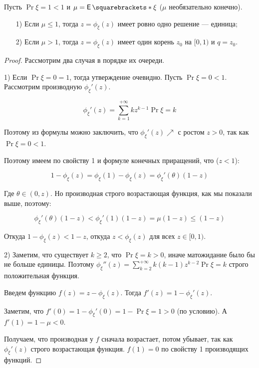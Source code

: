 \begin{theorem}
  Пусть $\Pr{\xi = 1} < 1$ и $\mu = \E{\xi}$ ($\mu$ необязательно конечно).

  \begin{itemize}
    \item[1)] Если $\mu \leq 1$, тогда $z = \phi_{\xi}(z)$  имеет ровно одно 
    решение --- единица;
    \item[2)] Если $\mu > 1$, тогда  $z = \phi_{\xi}(z)$ имеет один корень 
    $z_0$ на $[0, 1)$ и $q = z_0$.
  \end{itemize}
\end{theorem}

\begin{proof}
  Рассмотрим два случая в порядке их очереди.

  1) Если $\Pr{\xi = 0} = 1$, тогда утверждение очевидно. Пусть $\Pr{\xi = 0} < 1$.
  Рассмотрим производную $\phi_{\xi}'(z)$.

  \[
    \phi_{\xi}'(z) = \sum\limits_{k = 1}^{+\infty} kz^{k - 1}\Pr{\xi = k}
  \]

  Поэтому из формулы можно заключить, что $\phi_{\xi}'(z) \nearrow$ с ростом 
  $z > 0$, так как \newline $\Pr{\xi = 0} < 1$.

  Поэтому имеем по свойству 1 и формуле конечных приращений, что ($z < 1$):

  \[
    1 - \phi_{\xi}(z) = \phi_{\xi}(1) - \phi_{\xi}(z) = \phi_{\xi}'(\theta)(1 - z)
  \]

  Где $\theta \in (0, z)$. Но производная строго возрастающая функция, как мы показали
  выше, поэтому:

  \[
    \phi_{\xi}'(\theta)(1 - z) < \phi_{\xi}'(1)(1 - z) = \mu (1 - z) \leq (1 - z)
  \]

  Откуда $1 - \phi_{\xi}(z) < 1 - z$, откуда $z < \phi_{\xi}(z)$ для всех $z \in [0, 1)$.

  2) Заметим, что существует $k \geq 2$, что $\Pr{\xi = k} > 0$, иначе матожидание
  было бы не больше единицы. Поэтому $\phi_{\xi}''(z) = \sum\limits_{k = 2}^{+\infty}
  k(k - 1)z^{k - 2}\Pr{\xi = k}$ строго положительная функция.

  Введем функцию $f(z) = z - \phi_{\xi}(z)$. Тогда $f'(z) = 1 - \phi_{\xi}'(z)$.

  Заметим, что $f'(0) = 1 - \phi_{\xi}'(0) = 1 - \Pr{\xi = 1} > 0$ (по условию).
  А $f'(1) =  1 - \mu < 0$.

  Получаем, что производная у $f$ сначала возрастает, потом убывает, так как
  $\phi_{\xi}'(z)$ строго возрастающая функция. $f(1) = 0$ по свойству 1 
  производящих функций.


\end{proof}

